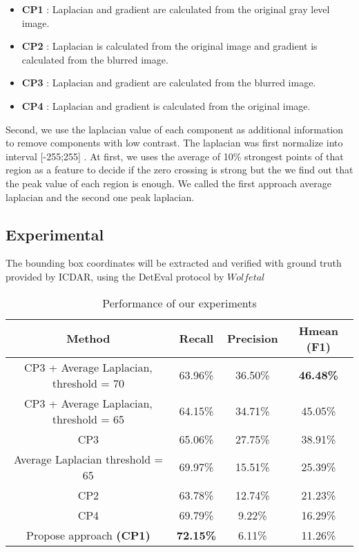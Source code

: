 \begin{itemize}
\item {\textbf{CP1}} : Laplacian and gradient are calculated from the original gray level image.
\item {\textbf{CP2}} : Laplacian is calculated from the original image and gradient is calculated from the blurred image.
\item {\textbf{CP3}} : Laplacian and gradient are calculated from the blurred image.
\item {\textbf{CP4}} : Laplacian  and gradient is calculated from the original image.
\end{itemize}

Second, we use the laplacian value of each component as additional information to remove components with low contrast. The laplacian was first normalize into interval [-255;255] . At first, we uses the average of 10\% strongest points of that region as a feature to decide if the zero crossing is strong but the we find out that the peak value of each region is enough. We called the first approach average laplacian and the second one peak laplacian.

\subsection{Experimental}
The bounding box coordinates will be extracted and verified with ground truth provided by ICDAR, using the DetEval protocol by $Wolf et al$ \cite{WolfIJDAR2006}

\begin {table}[H]
\caption{Performance of our experiments}\label{tab:performanceOur} 
\begin{tabular}{|c|c|c|c|}
\hline 
\textbf{Method} & \textbf{Recall} & \textbf{Precision} & \textbf{Hmean (F1)} \\ 
\hline 
CP3 + Average Laplacian, threshold = 70 & 63.96\% & 36.50\% & \textbf{46.48\%} \\ 
\hline 
CP3 + Average Laplacian, threshold = 65  & 64.15\% & 34.71\% & 45.05\%\\ 
\hline 
CP3 & 65.06\% & 27.75\% & 38.91\% \\ 
\hline
Average Laplacian threshold = 65  & 69.97\% & 15.51\% & 25.39\% \\ 
\hline  
CP2 & 63.78\% & 12.74\% & 21.23\% \\ 
\hline 
CP4 & 69.79\% & 9.22\% & 16.29\% \\ 
\hline 
Propose approach \textbf{(CP1)} &\textbf{ 72.15\%} & 6.11\% & 11.26\% \\ 
\hline 
\end{tabular} 

\end{table}

